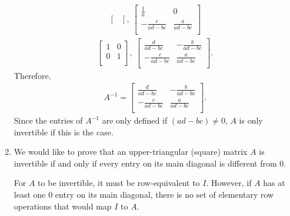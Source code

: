 \documentclass[12pt]{article}
\begin{document}
\begin{enumerate}
\begin{align*}
\begin{bmatrix}
      \end{bmatrix},\
      \begin{bmatrix}
        \frac{1}{a} & 0\\
        -\frac{c}{ad - bc}
          & \frac{a}{ad - bc}\\
      \end{bmatrix}
    \end{align*}
    \begin{align*}
      \begin{bmatrix}
        1 & 0\\
        0 & 1\\
      \end{bmatrix},\
      \begin{bmatrix}
        \frac{d}{ad - bc}
          & -\frac{b}{ad - bc}\\
        -\frac{c}{ad - bc}
          & \frac{a}{ad - bc}\\
      \end{bmatrix}.
    \end{align*}
    Therefore,
    \begin{align*}
      A^{-1} =
      \begin{bmatrix}
        \frac{d}{ad - bc}
          & -\frac{b}{ad - bc}\\
        -\frac{c}{ad - bc}
          & \frac{a}{ad - bc}\\
      \end{bmatrix}.
    \end{align*}
    Since the entries of $A^{-1}$ are only defined if $(ad - bc)
    \neq 0$, $A$ is only invertible if this is the case.

  \item
    We would like to prove that an upper-triangular (square)
    matrix $A$ is invertible if and only if every entry on its
    main diagonal is different from $0$.

    For $A$ to be invertible, it must be row-equivalent to $I$.
    However, if $A$ has at least one $0$ entry on its main
    diagonal, there is no set of elementary row operations that
    would map $I$ to $A$.


\end{enumerate}
\end{document}
